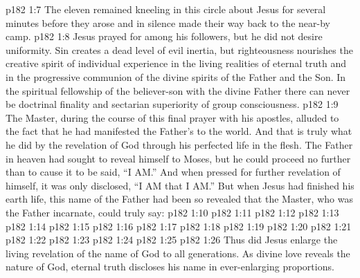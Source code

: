 \vs p182 1:7 The eleven remained kneeling in this circle about Jesus for several minutes before they arose and in silence made their way back to the near-by camp.
\vs p182 1:8 \pc Jesus prayed for  among his followers, but he did not desire uniformity. Sin creates a dead level of evil inertia, but righteousness nourishes the creative spirit of individual experience in the living realities of eternal truth and in the progressive communion of the divine spirits of the Father and the Son. In the spiritual fellowship of the believer\hyp{}son with the divine Father there can never be doctrinal finality and sectarian superiority of group consciousness.
\vs p182 1:9 The Master, during the course of this final prayer with his apostles, alluded to the fact that he had manifested the Father’s  to the world. And that is truly what he did by the revelation of God through his perfected life in the flesh. The Father in heaven had sought to reveal himself to Moses, but he could proceed no further than to cause it to be said, “I AM.” And when pressed for further revelation of himself, it was only disclosed, “I AM that I AM.” But when Jesus had finished his earth life, this name of the Father had been so revealed that the Master, who was the Father incarnate, could truly say:
\vs p182 1:10 
\vs p182 1:11 
\vs p182 1:12 
\vs p182 1:13 
\vs p182 1:14 
\vs p182 1:15 
\vs p182 1:16 
\vs p182 1:17 
\vs p182 1:18 
\vs p182 1:19 
\vs p182 1:20 
\vs p182 1:21 
\vs p182 1:22 
\vs p182 1:23 
\vs p182 1:24 
\vs p182 1:25 
\vs p182 1:26 \pc Thus did Jesus enlarge the living revelation of the name of God to all generations. As divine love reveals the nature of God, eternal truth discloses his name in ever\hyp{}enlarging proportions.
